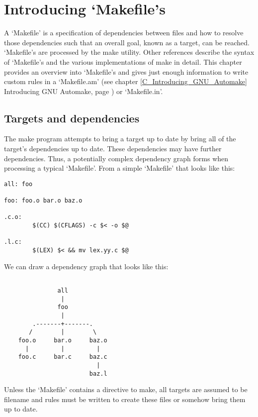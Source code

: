 \chapter{Introducing `Makefile's}


A `Makefile' is a specification of dependencies between files and how to 
resolve those dependencies such that an overall goal, known as a target, can 
be reached. `Makefile's are processed by the make utility. Other references 
describe the syntax of `Makefile's and the various implementations of make in 
detail. This chapter provides an overview into `Makefile's and gives just 
enough information to write custom rules in a `Makefile.am'
(see chapter \ref{C_Introducing_GNU_Automake} Introducing GNU Automake,
page \pageref{C_Introducing_GNU_Automake}) or `Makefile.in'. 

\section{Targets and dependencies}


The make program attempts to bring a target up to date by bring all of the target's dependencies up to date. These dependencies may have further dependencies. Thus, a potentially complex dependency graph forms when processing a typical `Makefile'. From a simple `Makefile' that looks like this: 

\bigskip
\begin{Verbatim}[frame=single]
all: foo

foo: foo.o bar.o baz.o

.c.o:
        $(CC) $(CFLAGS) -c $< -o $@

.l.c:
        $(LEX) $< && mv lex.yy.c $@

\end{Verbatim}

\bigskip
\noindent
We can draw a dependency graph that looks like this: 

 
\bigskip
\begin{Verbatim}[frame=single]

               all
                |
               foo
                |
        .-------+-------.
       /        |        \
    foo.o     bar.o     baz.o
      |         |         |
    foo.c     bar.c     baz.c
                          |
                        baz.l

\end{Verbatim}


\bigskip
\noindent
Unless the `Makefile' contains a directive to make, all targets are assumed to be filename and rules must be written to create these files or somehow bring them up to date. 


